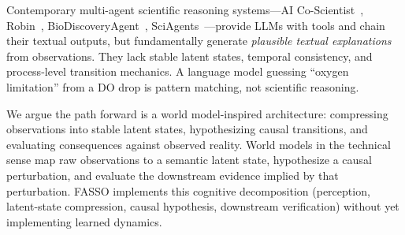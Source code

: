 \documentclass[11pt]{article}
\begin{document}
Contemporary multi-agent scientific reasoning systems—AI Co-Scientist~\citep{aicoscientist}, Robin~\citep{robin}, BioDiscoveryAgent~\citep{biodisco}, SciAgents~\citep{sciagents}—provide LLMs with tools and chain their textual outputs, but fundamentally generate \emph{plausible textual explanations} from observations. They lack stable latent states, temporal consistency, and process-level transition mechanics. A language model guessing ``oxygen limitation'' from a DO drop is pattern matching, not scientific reasoning.

We argue the path forward is a world model-inspired architecture: compressing observations into stable latent states, hypothesizing causal transitions, and evaluating consequences against observed reality. World models in the technical sense map raw observations to a semantic latent state, hypothesize a causal perturbation, and evaluate the downstream evidence implied by that perturbation. FASSO implements this cognitive decomposition (perception, latent-state compression, causal hypothesis, downstream verification) without yet implementing learned dynamics.
\end{document}
